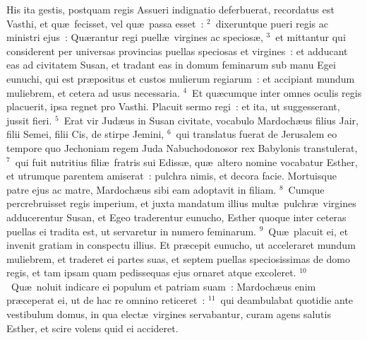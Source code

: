 \lettrine[lines=3,image=true,loversize=0.05,lraise=-0.03]{H}{}is ita gestis, postquam regis Assueri indignatio deferbuerat, recordatus est Vasthi, et qu\ae\ fecisset, vel qu\ae\ passa esset~:
${}^{2}$~dixeruntque pueri regis ac ministri ejus~: Qu\ae rantur regi puell\ae\ virgines ac specios\ae ,
${}^{3}$~et mittantur qui considerent per universas provincias puellas speciosas et virgines~: et adducant eas ad civitatem Susan, et tradant eas in domum feminarum sub manu Egei eunuchi, qui est pr\ae positus et custos mulierum regiarum~: et accipiant mundum muliebrem, et cetera ad usus necessaria.
${}^{4}$~Et qu\ae cumque inter omnes oculis regis placuerit, ipsa regnet pro Vasthi. Placuit sermo regi~: et ita, ut suggesserant, jussit fieri.
${}^{5}$~Erat vir Jud\ae us in Susan civitate, vocabulo Mardoch\ae us filius Jair, filii Semei, filii Cis, de stirpe Jemini,
${}^{6}$~qui translatus fuerat de Jerusalem eo tempore quo Jechoniam regem Juda Nabuchodonosor rex Babylonis transtulerat,
${}^{7}$~qui fuit nutritius fili\ae\ fratris sui Ediss\ae , qu\ae\ altero nomine vocabatur Esther, et utrumque parentem amiserat~: pulchra nimis, et decora facie. Mortuisque patre ejus ac matre, Mardoch\ae us sibi eam adoptavit in filiam.
${}^{8}$~Cumque percrebruisset regis imperium, et juxta mandatum illius mult\ae\ pulchr\ae\ virgines adducerentur Susan, et Egeo traderentur eunucho, Esther quoque inter ceteras puellas ei tradita est, ut servaretur in numero feminarum.
${}^{9}$~Qu\ae\ placuit ei, et invenit gratiam in conspectu illius. Et pr\ae cepit eunucho, ut acceleraret mundum muliebrem, et traderet ei partes suas, et septem puellas speciosissimas de domo regis, et tam ipsam quam pedissequas ejus ornaret atque excoleret.
${}^{10}$~Qu\ae\ noluit indicare ei populum et patriam suam~: Mardoch\ae us enim pr\ae ceperat ei, ut de hac re omnino reticeret~:
${}^{11}$~qui deambulabat quotidie ante vestibulum domus, in qua elect\ae\ virgines servabantur, curam agens salutis Esther, et scire volens quid ei accideret.


